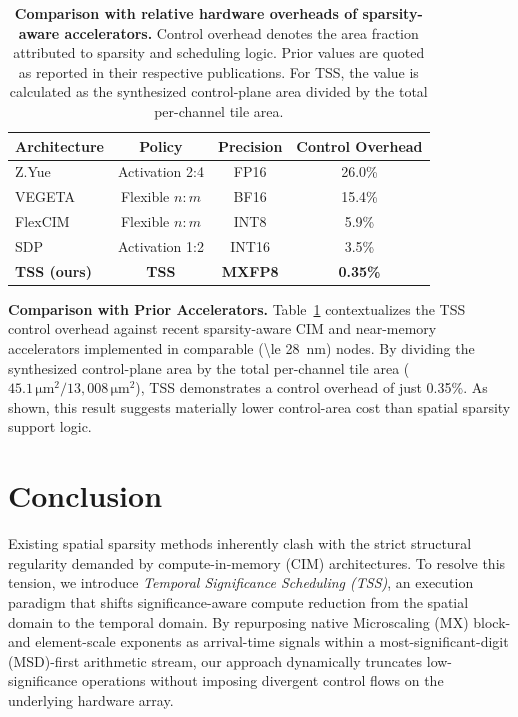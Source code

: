 \documentclass[sigconf]{acmart}
\begin{document}
\begin{table}[htbp]
  \centering
  \caption{%
    \textbf{Comparison with relative hardware overheads of sparsity-aware accelerators.} 
    Control overhead denotes the area fraction attributed to sparsity and 
    scheduling logic. Prior values are quoted as reported in their respective 
    publications. For TSS, the value is calculated as the synthesized control-plane 
    area divided by the total per-channel tile area.}
  \label{tab:hw_comparison}
  \small
  \begin{tabular}{@{}lccc@{}}
    \toprule
    \textbf{Architecture} & \textbf{Policy} & \textbf{Precision} & \textbf{Control Overhead} \\
    \midrule
    Z.Yue~\cite{10904702}          & Activation 2:4   & FP16  & 26.0\% \\
    VEGETA~\cite{jeong2023vegeta}            & Flexible $n{:}m$ & BF16  & 15.4\% \\
    FlexCIM~\cite{mishra2021accelerating}           & Flexible $n{:}m$ & INT8  & 5.9\% \\
    SDP~\cite{tu2022sdp}               & Activation 1:2   & INT16 & 3.5\% \\
    \textbf{TSS (ours)} & \textbf{TSS}   & \textbf{MXFP8} & \textbf{0.35\%} \\
    \bottomrule
  \end{tabular}
\end{table}

\textbf{Comparison with Prior Accelerators.}
Table~\ref{tab:hw_comparison} contextualizes the TSS control overhead against recent sparsity-aware CIM and near-memory accelerators implemented in comparable (\SI{\le 28}{\nano\meter}) nodes. By dividing the synthesized control-plane area by the total per-channel tile area ($45.1\,\si{\micro\meter\squared} / 13{,}008\,\si{\micro\meter\squared}$), TSS demonstrates a control overhead of just 0.35\%. As shown, this result suggests materially lower control-area cost than spatial sparsity support logic.


\section{Conclusion}
\label{sec:conclusion}

Existing spatial sparsity methods inherently clash with the strict structural regularity demanded by compute-in-memory (CIM) architectures. To resolve this tension, we introduce \emph{Temporal Significance Scheduling (TSS)}, an execution paradigm that shifts significance-aware compute reduction from the spatial domain to the temporal domain. By repurposing native Microscaling (MX) block- and element-scale exponents as arrival-time signals within a most-significant-digit (MSD)-first arithmetic stream, our approach dynamically truncates low-significance operations without imposing divergent control flows on the underlying hardware array.
\end{document}
